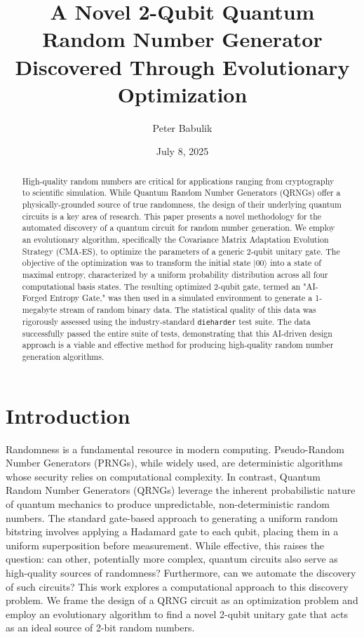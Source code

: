 \documentclass[11pt, a4paper]{article}
\title{\textbf{A Novel 2-Qubit Quantum Random Number Generator Discovered Through Evolutionary Optimization}}
\author{Peter Babulik}
\affil{\href{mailto:peter.babulik@gmail.com}{peter.babulik@gmail.com}}
\date{July 8, 2025}
\begin{document}
\maketitle

\begin{abstract}
\noindent High-quality random numbers are critical for applications ranging from cryptography to scientific simulation. While Quantum Random Number Generators (QRNGs) offer a physically-grounded source of true randomness, the design of their underlying quantum circuits is a key area of research. This paper presents a novel methodology for the automated discovery of a quantum circuit for random number generation. We employ an evolutionary algorithm, specifically the Covariance Matrix Adaptation Evolution Strategy (CMA-ES), to optimize the parameters of a generic 2-qubit unitary gate. The objective of the optimization was to transform the initial state $|00\rangle$ into a state of maximal entropy, characterized by a uniform probability distribution across all four computational basis states. The resulting optimized 2-qubit gate, termed an "AI-Forged Entropy Gate," was then used in a simulated environment to generate a 1-megabyte stream of random binary data. The statistical quality of this data was rigorously assessed using the industry-standard \texttt{dieharder} test suite. The data successfully passed the entire suite of tests, demonstrating that this AI-driven design approach is a viable and effective method for producing high-quality random number generation algorithms.
\end{abstract}

\section{Introduction}
Randomness is a fundamental resource in modern computing. Pseudo-Random Number Generators (PRNGs), while widely used, are deterministic algorithms whose security relies on computational complexity. In contrast, Quantum Random Number Generators (QRNGs) leverage the inherent probabilistic nature of quantum mechanics to produce unpredictable, non-deterministic random numbers. The standard gate-based approach to generating a uniform random bitstring involves applying a Hadamard gate to each qubit, placing them in a uniform superposition before measurement. While effective, this raises the question: can other, potentially more complex, quantum circuits also serve as high-quality sources of randomness? Furthermore, can we automate the discovery of such circuits? This work explores a computational approach to this discovery problem. We frame the design of a QRNG circuit as an optimization problem and employ an evolutionary algorithm to find a novel 2-qubit unitary gate that acts as an ideal source of 2-bit random numbers.
\end{document}
